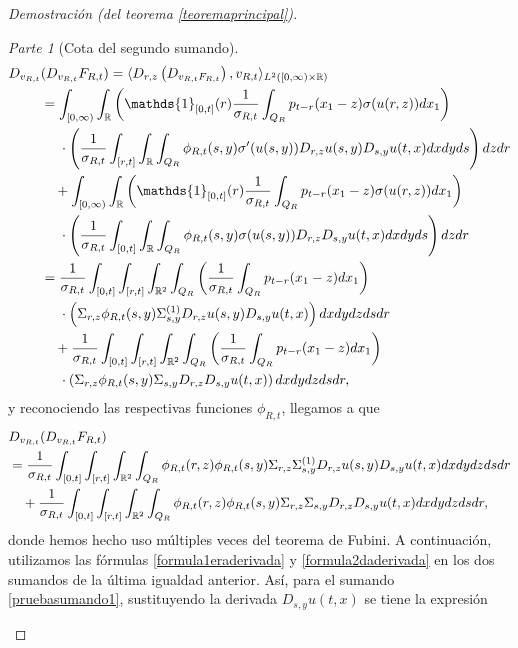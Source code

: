 \documentclass[letterpaper,twoside,12pt]{book}
\newcommand{\R}{\mathbb{R}}
\newcommand{\1}{\mathds{1}}
\theoremstyle{definition}
\theoremstyle{definition}
\theoremstyle{remark}
\newtheorem{proofpart}{Parte}
\theoremstyle{definition}
\theoremstyle{definition}
\theoremstyle{definition}
\theoremstyle{definition}
\theoremstyle{definition}
\begin{document}
\begin{proof}[Demostración (del teorema \ref{teoremaprincipal})]
\begin{proofpart}[Cota del segundo sumando]
\begin{align}
   D_{v_{R,t}}&(D_{v_{R,t}}F_{R,t})=\langle D_{r,z}\left(D_{v_{R,t}F_{R,t}}\right),v_{R,t}\rangle_{L^{2}([0,\infty)\times\R)}\notag\\
   &=\int_{[0,\infty)}\int_\R \left(\1_{[0,t]}(r)\frac{1}{\sigma_{R,t}}\int_{Q_R}p_{t-r}(x_1-z)\sigma(u(r,z))dx_1\right)\notag\\
   &\ \ \ \ \cdot \left(\frac{1}{\sigma_{R,t}}\int_{[r,t]}\int_\R \int_{Q_R}\phi_{R,t}(s,y)\sigma'(u(s,y))D_{r,z}u(s,y)D_{s,y}u(t,x)dx dy ds\right)dz dr\notag\\
   &\ \ \ +\int_{[0,\infty)}\int_\R \left(\1_{[0,t]}(r)\frac{1}{\sigma_{R,t}}\int_{Q_R}p_{t-r}(x_1-z)\sigma(u(r,z))dx_1\right)\notag\\
   &\ \ \ \ \cdot\left(\frac{1}{\sigma_{R,t}}\int_{[0,t]}\int_\R \int_{Q_R}\phi_{R,t}(s,y)\sigma(u(s,y))D_{r,z}D_{s,y}u(t,x)dx dy ds\right)dz dr\notag\\
   &=\frac{1}{\sigma_{R,t}}\int_{[0,t]}\int_{[r,t]}\int_{\R^2}\int_{Q_R}\left(\frac{1}{\sigma_{R,t}}\int_{Q_R}p_{t-r}(x_1-z)dx_1\right)\notag\\
   &\ \ \ \ \cdot \left(\Sigma_{r,z}\phi_{R,t}(s,y)\Sigma^{(1)}_{s,y}D_{r,z}u(s,y)D_{s,y}u(t,x)\right) dx dy dz ds dr\notag\\
   &\ \ \ +\frac{1}{\sigma_{R,t}}\int_{[0,t]}\int_{[r,t]}\int_{\R^2}\int_{Q_R} \left(\frac{1}{\sigma_{R,t}}\int_{Q_R}p_{t-r}(x_1-z)dx_1\right)\notag\\
   &\ \ \ \ \cdot\left(\Sigma_{r,z}\phi_{R,t}(s,y)\Sigma_{s,y}D_{r,z}D_{s,y}u(t,x)\right)dx dy dz ds dr,\notag
   \end{align}
   y reconociendo las respectivas funciones $\phi_{R,t}$, llegamos a que 
   \begin{align}
      &D_{v_{R,t}}(D_{v_{R,t}}F_{R,t})\notag\\
      &=\frac{1}{\sigma_{R,t}}\int_{[0,t]}\int_{[r,t]}\int_{\R^2}\int_{Q_R}\phi_{R,t}(r,z)\phi_{R,t}(s,y)\Sigma_{r,z}\Sigma^{(1)}_{s,y}D_{r,z}u(s,y)D_{s,y}u(t,x)dx dy dz ds dr\label{pruebasumando1}\\ 
   &\ \ \ +\frac{1}{\sigma_{R,t}}\int_{[0,t]}\int_{[r,t]}\int_{\R^2}\int_{Q_R}\phi_{R,t}(r,z)\phi_{R,t}(s,y)\Sigma_{r,z}\Sigma_{s,y}D_{r,z}D_{s,y}u(t,x)dx dy dz ds dr,\label{pruebasumando2}
\end{align}
   donde hemos hecho uso múltiples veces del teorema de Fubini. A continuación, utilizamos las fórmulas \eqref{formula1eraderivada} y \eqref{formula2daderivada} en los dos sumandos de la última igualdad anterior. Así, para el sumando \eqref{pruebasumando1}, sustituyendo la derivada $D_{s,y}u(t,x)$ se tiene la expresión

\end{proofpart}
\end{proof}
\end{document}
